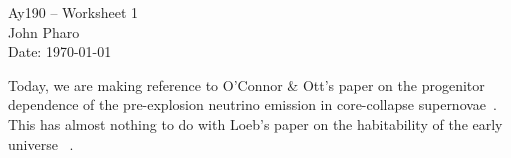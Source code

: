 \documentclass[11pt,letterpaper]{article}
\begin{document}
\begin{center}
\Large
Ay190 -- Worksheet 1\\
John Pharo\\
Date: \today
\end{center}

Today, we are making reference to O'Connor \& Ott's paper on the
progenitor dependence of the pre-explosion neutrino emission in
core-collapse supernovae~\cite{oconnor:13}. This has almost nothing to do with Loeb's paper on the habitability of the early universe ~\cite{loeb:13}.




\end{document}
